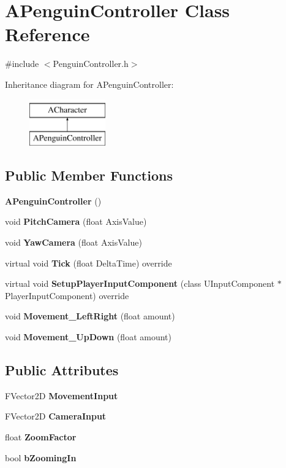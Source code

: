 \section{A\+Penguin\+Controller Class Reference}
\label{class_a_penguin_controller}


{\ttfamily \#include $<$Penguin\+Controller.\+h$>$}

Inheritance diagram for A\+Penguin\+Controller\+:\begin{figure}[H]
\begin{center}
\leavevmode
\includegraphics[height=2.000000cm]{class_a_penguin_controller}
\end{center}
\end{figure}
\subsection*{Public Member Functions}
\begin{DoxyCompactItemize}
\item 
\textbf{ A\+Penguin\+Controller} ()
\item 
void \textbf{ Pitch\+Camera} (float Axis\+Value)
\item 
void \textbf{ Yaw\+Camera} (float Axis\+Value)
\item 
virtual void \textbf{ Tick} (float Delta\+Time) override
\item 
virtual void \textbf{ Setup\+Player\+Input\+Component} (class U\+Input\+Component $\ast$Player\+Input\+Component) override
\item 
void \textbf{ Movement\+\_\+\+Left\+Right} (float amount)
\item 
void \textbf{ Movement\+\_\+\+Up\+Down} (float amount)
\end{DoxyCompactItemize}
\subsection*{Public Attributes}
\begin{DoxyCompactItemize}
\item 
F\+Vector2D \textbf{ Movement\+Input}
\item 
F\+Vector2D \textbf{ Camera\+Input}
\item 
float \textbf{ Zoom\+Factor}
\item 
bool \textbf{ b\+Zooming\+In}
\end{DoxyCompactItemize}
